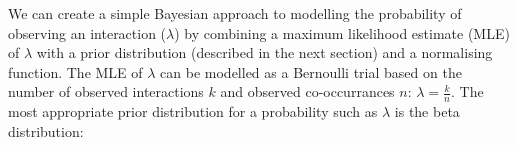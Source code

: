 \documentclass[12pt]{article}
\begin{document}
\begin{spacing}{2.0}
  







    We can create a simple Bayesian approach to modelling the probability of observing an interaction ($\lambda$) by combining a maximum likelihood estimate (MLE) of $\lambda$ with a prior distribution (described in the next section) and a normalising function. The MLE of $\lambda$ can be modelled as a Bernoulli trial based on the number of observed interactions $k$ and observed co-occurrances $n$: $\lambda = \frac{k}{n}$. The most appropriate prior distribution for a probability such as $\lambda$ is the beta distribution:


\end{spacing}
\end{document}
